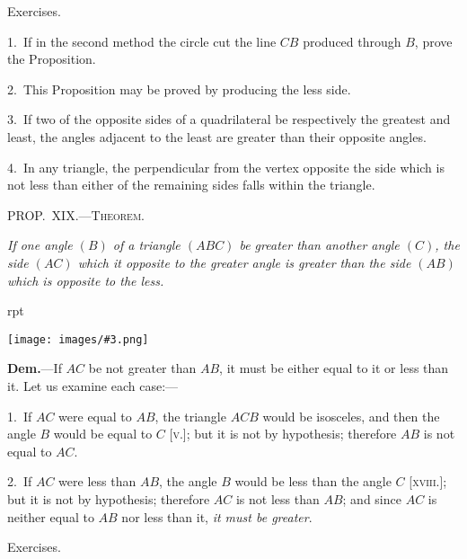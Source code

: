 \documentclass[oneside]{book}
\newcounter{wrapwidth}
\newcommand\mypropl[2]{
\bigskip\Needspace*{4\baselineskip}\begin{center}\textsc{#1}\end{center}
\hspace{\parindent}\emph{#2}\par\medskip
}
\newcommand\exhead[1]{
\Needspace*{5\baselineskip}\begin{center}
\textsf{#1}
\end{center}
}
\newcommand\imgflow[3]{
\setcounter{wrapwidth}{#1}
\begin{wrapfigure}[#2]{r}{\value{wrapwidth}pt}
\begin{center}
\vspace{-0.3in}
\texttt{[image: images/\#3.png]}
\end{center}
\end{wrapfigure}
}
\begin{document}
\exhead{Exercises.}

\begin{footnotesize}
1.~If in the second method the circle cut the line $CB$ produced
through $B$, prove the Proposition.

2.~This Proposition may be proved by producing the less side.

3.~If two of the opposite sides of a quadrilateral be respectively
the greatest and least, the angles adjacent to the least are greater
than their opposite angles.

4.~In any triangle, the perpendicular from the vertex opposite
the side which is not less than either of the remaining sides falls
within the triangle.
\par\end{footnotesize}


\mypropl{PROP\@.~XIX\@.---Theorem.}{If one angle $(B)$ of a triangle $(ABC)$ be greater than
another angle $(C)$, the side $(AC)$ which it opposite to the
greater angle is greater than the side $(AB)$ which is opposite
to the less.}

\imgflow{115}{8}{f035}

\textbf{Dem.}---If $AC$ be not greater than $AB$, it must be
either equal to it or less than it.
Let us examine each case:---

1.~If $AC$ were equal to $AB$,
the triangle $ACB$ would be
isosceles, and then the angle $B$
would be equal to $C$ [\textsc{v}.]; but it
is not by hypothesis; therefore
$AB$ is not equal to $AC$.

2.~If $AC$ were less than $AB$, the angle $B$ would be
less than the angle $C$ [\textsc{xviii}.]; but it is not by hypothesis;
therefore $AC$ is not less than $AB$; and since $AC$ is
neither equal to $AB$ nor less than it, \emph{it must be greater}.

\exhead{Exercises.}
\end{document}
